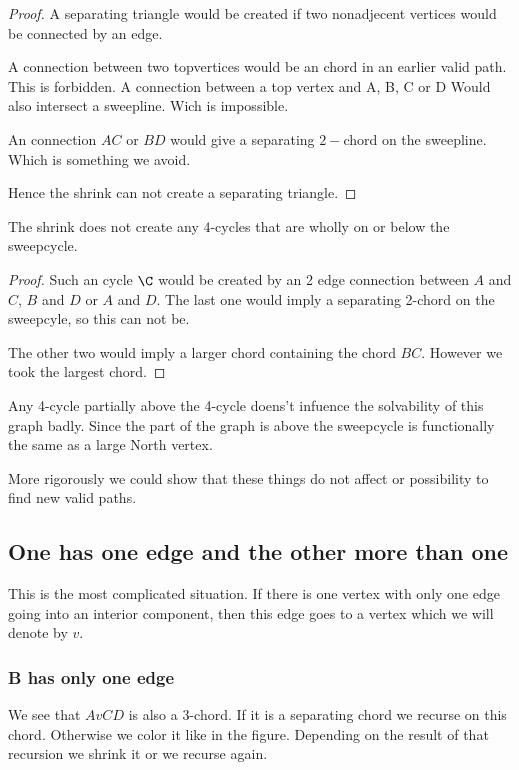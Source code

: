 \begin{proof}
  A separating triangle would be created if two nonadjecent vertices would be connected by an edge.

  A connection between two topvertices would be an chord in an earlier valid path. This is forbidden. A connection between a top vertex and A, B, C or D Would also intersect a sweepline. Wich is impossible.

  An connection $AC$ or $BD$ would give a separating $2-$chord on the sweepline. Which is something we avoid.

  Hence the shrink can not create a separating triangle.
\end{proof}



\begin{lemma}
  \label{lm:}
  The shrink does not create any $4$-cycles that are wholly on or below the sweepcycle.
\end{lemma}

\begin{proof}
  Such an cycle $\C$ would be created by an 2 edge connection between $A$ and $C$, $B$ and $D$ or $A$ and $D$. The last one would imply a separating 2-chord on the sweepcyle, so this can not be.

  The other two would imply a larger chord containing the chord $BC$. However we took the largest chord.
\end{proof}

Any 4-cycle partially above the 4-cycle doens't infuence the solvability of this graph badly. Since the part of the graph is above the sweepcycle is functionally the same as a large North vertex. 

More rigorously we could show that these things do not affect or possibility to find new valid paths.


\subsection{One has one edge and the other more than one}
This is the most complicated situation. If there is one vertex with only one edge going into an interior component, then this edge goes to a vertex which we will denote by $v$.

\subsubsection{B has only one edge}
We see that $AvCD$ is also a 3-chord. If it is a separating chord we recurse on this chord. Otherwise we color it like in the figure. Depending on the result of that recursion we shrink it or we recurse again.

